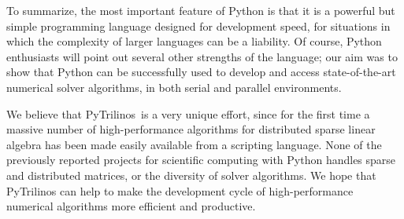 \documentclass[10pt,relax]{SANDreport}
\newcommand{\PyTrilinos}{{PyTrilinos}}
\begin{document}
\smallskip

To summarize, the most important feature of Python is that it is a
powerful but simple programming language designed for development
speed, for situations in which the complexity of larger languages can
be a liability. Of course, Python enthusiasts will point out several
other strengths of the language; our aim was to show that Python can
be successfully used to develop and access state-of-the-art numerical
solver algorithms, in both serial and parallel environments.

We believe that \PyTrilinos\ is a very unique effort, since for the
first time a massive number of high-performance algorithms for
distributed sparse linear algebra has been made easily available from
a scripting language.  None of the previously reported projects for
scientific computing with Python handles sparse and distributed
matrices, or the diversity of solver algorithms. We hope that PyTrilinos can
help to make the development cycle of high-performance numerical algorithms
more efficient and productive.



\end{document}
